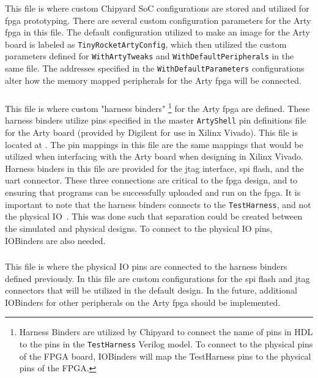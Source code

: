 \subsubsection{}\label{sec:Customizing_FPGA-Configs.scala}
This file is where custom Chipyard SoC configurations are stored and utilized for \Gls{fpga} prototyping.
There are several custom configuration parameters for the Arty \Gls{fpga} in this file.
The default configuration utilized to make an image for the Arty board is labeled as \texttt{TinyRocketArtyConfig}, which then utilized the custom parameters defined for \texttt{WithArtyTweaks} and \texttt{WithDefaultPeripherals} in the same file.
The addresses specified in the \texttt{WithDefaultParameters} configurations alter how the memory mapped peripherals for the Arty \Gls{fpga} will be connected.

\subsubsection{}\label{sec:Customizing_FPGA-HarnessBinders.scala}
This file is where custom "harness binders"
\footnote{Harness Binders are utilized by Chipyard to connect the name of pins in HDL to the pins in the \texttt{TestHarness} Verilog model. To connect to the physical pins of the FPGA board, IOBinders will map the TestHarness pins to the physical pins of the FPGA.}
 for the Arty \Gls{fpga} are defined.
These harness binders utilize pins specified in the master \texttt{ArtyShell} pin definitions file for the Arty board (provided by Digilent for use in Xilinx Vivado).
This file is located at .
The pin mappings in this file are the same mappings that would be utilized when interfacing with the Arty board when designing in Xilinx Vivado.
Harness binders in this file are provided for the \Gls{jtag} interface, \Gls{spi} flash, and the \Gls{uart}  connector.
These three connections are critical to the \Gls{fpga} design, and to ensuring that programs can be successfully uploaded and run on the \Gls{fpga}.
It is important to note that the harness binders connects to the \texttt{TestHarness}, and not the physical IO~\cite{Chipyard_IO}.
This was done such that separation could be created between the simulated and physical designs.
To connect to the physical IO pins, IOBinders are also needed.

\subsubsection{}\label{sec:Customizing_FPGA-IOBinders.scala}
This file is where the physical IO pins are connected to the harness binders defined previously.
In this file are custom configurations for the \Gls{spi} flash and \Gls{jtag} connectors that will be utilized in the default design.
In the future, additional IOBinders for other peripherals on the Arty \Gls{fpga} should be implemented.

